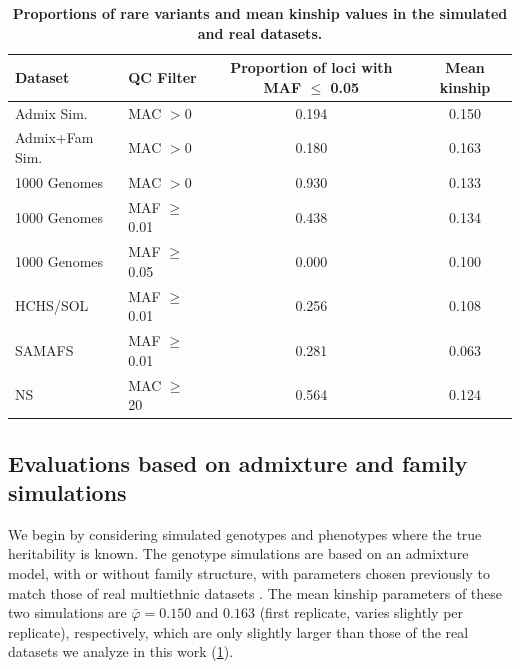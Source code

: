 \documentclass[11pt]{article}
\begin{document}
\begin{table}[bp!]
    \centering
    \small
    \caption{\textbf{Proportions of rare variants and mean kinship values in the simulated and real datasets.}}
    \label{tab:maf}
    \begin{tabular}{llcc}
        \toprule
        Dataset & QC Filter & Proportion of loci with MAF $\leq$ 0.05 & Mean kinship \\
        \midrule
        Admix Sim.     & MAC $>0$        & 0.194 & 0.150 \\
        Admix+Fam Sim. & MAC $>0$        & 0.180 & 0.163 \\
        1000 Genomes   & MAC $>0$        & 0.930 & 0.133 \\
        1000 Genomes   & MAF $\geq$ 0.01 & 0.438 & 0.134 \\
        1000 Genomes   & MAF $\geq$ 0.05 & 0.000 & 0.100 \\
        HCHS/SOL       & MAF $\geq$ 0.01 & 0.256 & 0.108 \\
        SAMAFS         & MAF $\geq$ 0.01 & 0.281 & 0.063 \\
        NS             & MAC $\geq$ 20   & 0.564 & 0.124 \\
        \bottomrule
    \end{tabular}
\end{table}

\subsection{Evaluations based on admixture and family simulations}

We begin by considering simulated genotypes and phenotypes where the true heritability is known.
The genotype simulations are based on an admixture model, with or without family structure, with parameters chosen previously to match those of real multiethnic datasets \citep{yao_limitations_2022}.
The mean kinship parameters of these two simulations are $\bar{\varphi} = 0.150$ and $0.163$ (first replicate, varies slightly per replicate), respectively, which are only slightly larger than those of the real datasets we analyze in this work (\cref{tab:maf}).
\end{document}
